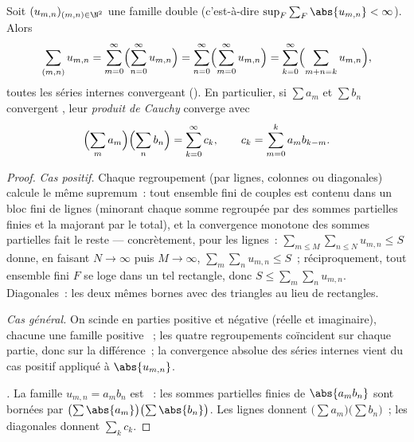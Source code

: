 \begin{theorem}\label{thm:b2:series:fubini}
Soit $(u_{m,n})_{(m,n) \in \N^2}$ une famille double 
(c'est-à-dire $\sup_F \sum_F \abs{u_{m,n}} < \infty$).
Alors
\[
\sum_{(m,n)} u_{m,n}
= \sum_{m=0}^{\infty}\Bigl(\sum_{n=0}^{\infty} u_{m,n}\Bigr)
= \sum_{n=0}^{\infty}\Bigl(\sum_{m=0}^{\infty} u_{m,n}\Bigr)
= \sum_{k=0}^{\infty}\Bigl(\sum_{m+n=k} u_{m,n}\Bigr),
\]
toutes les séries internes convergeant (). En particulier,
si $\sum a_m$ et $\sum b_n$ convergent , leur \emph{produit
de Cauchy} converge  avec
\[
\Bigl(\sum_m a_m\Bigr)\Bigl(\sum_n b_n\Bigr)
= \sum_{k=0}^{\infty} c_k,
\qquad
c_k = \sum_{m=0}^{k} a_m b_{k-m} .
\]
\end{theorem}

\begin{proof}
\emph{Cas positif.} Chaque regroupement (par lignes, colonnes ou
diagonales) calcule le même supremum~: tout ensemble fini de couples
est contenu dans un bloc fini de lignes (minorant chaque somme
regroupée par des sommes partielles finies et la majorant par le
total), et la convergence monotone des sommes partielles fait le
reste --- concrètement, pour les lignes~: $\sum_{m \leq M}\sum_{n
\leq N} u_{m,n} \leq S$ donne, en faisant $N \to \infty$ puis $M \to
\infty$, $\sum_m \sum_n u_{m,n} \leq S$~; réciproquement, tout
ensemble fini $F$ se loge dans un tel rectangle, donc $S \leq
\sum_m\sum_n u_{m,n}$. Diagonales~: les deux mêmes bornes avec des
triangles au lieu de rectangles.

\emph{Cas général.} On scinde en parties positive et négative (réelle
et imaginaire), chacune une famille positive ~; les quatre
regroupements coïncident sur chaque partie, donc sur la différence~;
la convergence absolue des séries internes vient du cas positif
appliqué à $\abs{u_{m,n}}$.

\emph{.} La famille $u_{m,n} = a_m b_n$ est
~: les sommes partielles finies de $\abs{a_mb_n}$ sont
bornées par $\bigl(\sum\abs{a_m}\bigr)\bigl(\sum\abs{b_n}\bigr)$. Les
lignes donnent $\bigl(\sum a_m\bigr)\bigl(\sum b_n\bigr)$~; les
diagonales donnent $\sum_k c_k$.
\end{proof}

